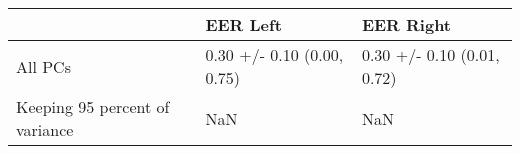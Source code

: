 \begin{tabular}{lll}
\toprule
{} &                    EER Left &                   EER Right \\
\midrule
All PCs                        &  0.30 +/- 0.10 (0.00, 0.75) &  0.30 +/- 0.10 (0.01, 0.72) \\
Keeping 95 percent of variance &                         NaN &                         NaN \\
\bottomrule
\end{tabular}
